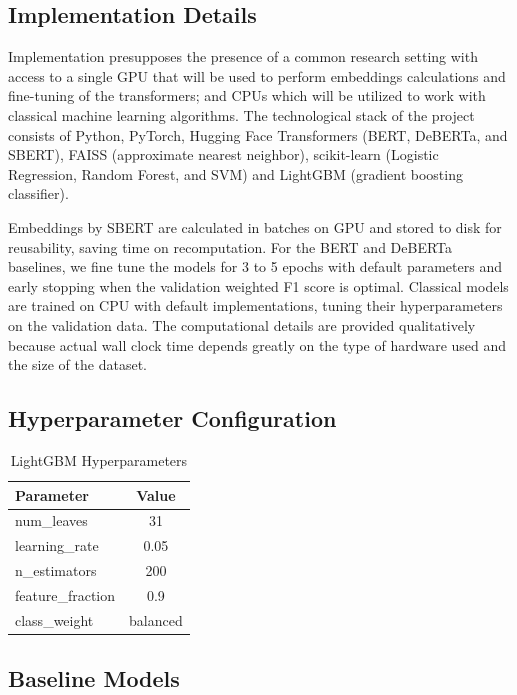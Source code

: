 \documentclass[11pt]{article}
\begin{document}
\subsection{Implementation Details}

Implementation presupposes the presence of a common research setting with access to a single GPU that will be used to perform embeddings calculations and fine-tuning of the transformers; and CPUs which will be utilized to work with classical machine learning algorithms. The technological stack of the project consists of Python, PyTorch, Hugging Face Transformers (BERT, DeBERTa, and SBERT), FAISS (approximate nearest neighbor), scikit-learn (Logistic Regression, Random Forest, and SVM) and LightGBM (gradient boosting classifier).

Embeddings by SBERT are calculated in batches on GPU and stored to disk for reusability, saving time on recomputation. For the BERT and DeBERTa baselines, we fine tune the models for 3 to 5 epochs with default parameters and early stopping when the validation weighted F1 score is optimal. Classical models are trained on CPU with default implementations, tuning their hyperparameters on the validation data. The computational details are provided qualitatively because actual wall clock time depends greatly on the type of hardware used and the size of the dataset.

\subsection{Hyperparameter Configuration}

\begin{table}[H]
\centering
\caption{LightGBM Hyperparameters}
\begin{tabular}{lc}
\toprule
Parameter & Value \\
\midrule
num\_leaves & 31 \\
learning\_rate & 0.05 \\
n\_estimators & 200 \\
feature\_fraction & 0.9 \\
class\_weight & balanced \\
\bottomrule
\end{tabular}
\label{tab:hyperparams}
\end{table}


\subsection{Baseline Models}
\end{document}
